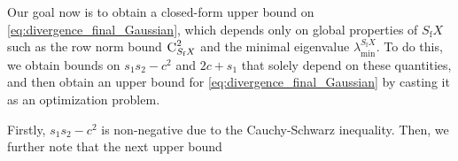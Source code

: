 \documentclass[11pt]{article}
\theoremstyle{definition}
\theoremstyle{plain}
\providecommand{\brI}{\mathbb{I}}
\newcommand{\Norm}[1]{\left\| #1 \right\|}
\providecommand{\norm}[1]{\Norm{#1}}
\begin{document}
Our goal now is to obtain a closed-form upper bound on \eqref{eq:divergence_final_Gaussian}, which depends only on global properties of $S_{\mathrm{f}}X$ such as the row norm bound $\textsc{C}^2_{S_{\mathrm{f}}X}$ and the minimal eigenvalue $\lambda^{S_{\mathrm{f}}X}_{\min}$. To do this, we obtain bounds on \(s_{1}s_{2} - c^{2}\) and \(2c + s_{1}\) that solely depend on these quantities, and then obtain an upper bound for \eqref{eq:divergence_final_Gaussian} by casting it as an optimization problem.

Firstly, \(s_{1}s_{2} - c^{2}\) is non-negative due to the Cauchy-Schwarz inequality. Then, we further note that the next upper bound
\end{document}
